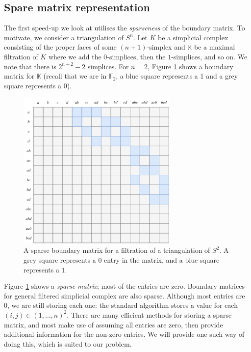 \subsection{Spare matrix representation}

The first speed-up we look at utilises the \emph{sparseness} of the boundary matrix. To motivate, we consider a triangulation of $S^n$. Let $K$ be a simplicial complex consisting of the proper faces of some $(n+1)$-simplex and $\mathbb K$ be a maximal filtration of $K$ where we add the $0$-simplices, then the $1$-simplices, and so on. We note that there is $2^{n+2} - 2$ simplices. For $n = 2$, Figure \ref{fig:sparse-matrix-ex} shows a boundary matrix for $\mathbb K$ (recall that we are in $\mathbb F_2$, a blue square represents a 1 and a grey square represents a 0).

\begin{figure}
  \centering
  \includegraphics[width=0.7\textwidth]{content/4-comp-top/images/sparse-matrix-ex}
  \caption{A sparse boundary matrix for a filtration of a triangulation of $S^2$. A grey square represents a $0$ entry in the matrix, and a blue square represents a $1$.}
  \label{fig:sparse-matrix-ex}
\end{figure}

Figure \ref{fig:sparse-matrix-ex} shows a \emph{sparse matrix}; most of the entries are zero. Boundary matrices for general filtered simplicial complex are also sparse. Although most entries are 0, we are still storing each one: the standard algorithm stores a value for each $(i, j) \in (1, \ldots, n)^2$. There are many efficient methods for storing a sparse matrix, and most make use of assuming all entries are zero, then provide additional information for the non-zero entries. We will provide one such way of doing this, which is suited to our problem. 

